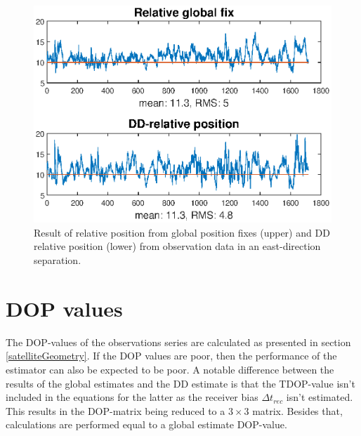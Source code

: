 \begin{figure}[!htb]
\centering
\includegraphics[width=\textwidth]{Results/MSEplots/Eobs.eps}
\caption{\label{fig:Eobs} Result of relative position from global position fixes (upper) and DD relative position (lower) from observation data in an east-direction separation.}
\end{figure}

\section{DOP values}\label{sectionDOP}
The DOP-values of the observations series are calculated as presented in section \ref{satelliteGeometry}. If the DOP values are poor, then the performance of the estimator can also be expected to be poor. A notable difference between the results of the global estimates and the DD estimate is that the TDOP-value isn't included in the equations for the latter as the receiver bias $\Delta t_{rec}$ isn't estimated. This results in the DOP-matrix being reduced to a $3\times3$ matrix. Besides that, calculations are performed equal to a global estimate DOP-value.

